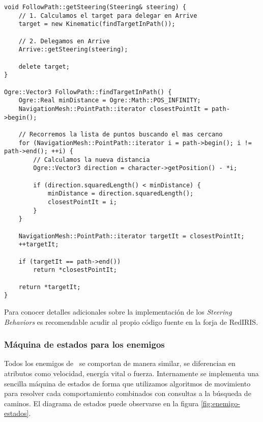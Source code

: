 \begin{lstlisting}[style=C++]
void FollowPath::getSteering(Steering& steering) {
    // 1. Calculamos el target para delegar en Arrive
    target = new Kinematic(findTargetInPath());
    
    // 2. Delegamos en Arrive
    Arrive::getSteering(steering);
    
    delete target;
}

Ogre::Vector3 FollowPath::findTargetInPath() {
    Ogre::Real minDistance = Ogre::Math::POS_INFINITY;
    NavigationMesh::PointPath::iterator closestPointIt = path->begin();
    
    // Recorremos la lista de puntos buscando el mas cercano
    for (NavigationMesh::PointPath::iterator i = path->begin(); i != path->end(); ++i) {
        // Calculamos la nueva distancia
        Ogre::Vector3 direction = character->getPosition() - *i;
        
        if (direction.squaredLength() < minDistance) {
            minDistance = direction.squaredLength();
            closestPointIt = i;
        }
    }
    
    NavigationMesh::PointPath::iterator targetIt = closestPointIt;
    ++targetIt;
    
    if (targetIt == path->end())
        return *closestPointIt;
    
    return *targetIt;
}
\end{lstlisting}

Para conocer detalles adicionales sobre la implementación de los
\textit{Steering Behaviors} es recomendable acudir al propio código fuente
en la forja de RedIRIS.\\

\subsubsection{Máquina de estados para los enemigos}


Todos los enemigos de \juego\ se comportan de manera similar, se diferencian
en atributos como velocidad, energía vital o fuerza. Internamente se implementa
una sencilla máquina de estados de forma que utilizamos algoritmos de movimiento
para resolver cada comportamiento combinados con consultas a la búsqueda
de caminos. El diagrama de estados puede observarse en la figura \ref{fig:enemigo-estados}.\\


